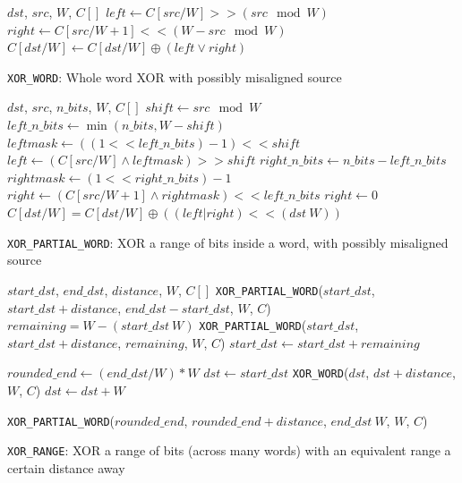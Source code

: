 \begin{algorithm}
\begin{algorithmic}[1]
  \REQUIRE $dst$, $src$, $W$, $C[]$
  \STATE $left \gets C[src / W] >> (src \mod W)$
  \STATE $right \gets C[src / W + 1] << (W - src \mod W)$
  \STATE $C[dst / W] \gets C[dst / W] \oplus (left \lor right)$
  \caption{\texttt{XOR\_WORD}: Whole word XOR with possibly misaligned source}
\end{algorithmic}
\end{algorithm}

\begin{algorithm}
\begin{algorithmic}[1]
  \REQUIRE $dst$, $src$, $n\_bits$, $W$, $C[]$
  \STATE $shift \gets src \mod W$
  \STATE $left\_n\_bits \gets \min(n\_bits, W - shift)$
  \STATE $leftmask \gets ((1 << left\_n\_bits) - 1) << shift$
  \STATE $left \gets (C[src / W] \land leftmask) >> shift$
  \STATE $right\_n\_bits \gets n\_bits - left\_n\_bits$
    \STATE $rightmask \gets (1 << right\_n\_bits) - 1$
    \STATE $right \gets (C[src/W+1] \land rightmask) << left\_n\_bits$
  \ELSE
    \STATE $right \gets 0$
  \ENDIF
  \STATE $C[dst/W] = C[dst/W] \oplus ((left | right) << (dst \ W))$
  \caption{\texttt{XOR\_PARTIAL\_WORD}: XOR a range of bits inside a word, with possibly misaligned source}
\end{algorithmic}
\end{algorithm}

\begin{algorithm}
\begin{algorithmic}[1]
  \REQUIRE $start\_dst$, $end\_dst$, $distance$, $W$, $C[]$
    \STATE \texttt{XOR\_PARTIAL\_WORD}($start\_dst$, $start\_dst + distance$, $end\_dst - start\_dst$, $W$, $C$)
  \ELSE
      \STATE $remaining = W - (start\_dst \ W)$
      \STATE \texttt{XOR\_PARTIAL\_WORD}($start\_dst$, $start\_dst + distance$, $remaining$, $W$, $C$)
      \STATE $start\_dst \gets start\_dst + remaining$
    \ENDIF
    
    \STATE $rounded\_end \gets (end\_dst / W) * W$
    \STATE $dst \gets start\_dst$
      \STATE \texttt{XOR\_WORD}($dst$, $dst + distance$, $W$, $C$)
      \STATE $dst \gets dst + W$
    \ENDWHILE
    
      \STATE \texttt{XOR\_PARTIAL\_WORD}($rounded\_end$, $rounded\_end + distance$, $end\_dst \ W$, $W$, $C$)
    \ENDIF
  \ENDIF
  \caption{\texttt{XOR\_RANGE}: XOR a range of bits (across many words) with an equivalent range a certain distance away}
\end{algorithmic}
\end{algorithm}



